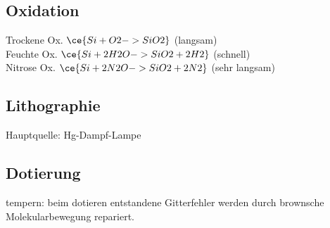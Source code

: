\documentclass[fs, footer]{latex4ei}
\begin{document}
\begin{multicols*}{4}
	
	\subsection{Oxidation}
	Trockene Ox. $\ce{Si + O2 -> SiO2}$ \qquad (langsam)\\
	Feuchte Ox. $\ce{Si + 2H2O -> SiO2 + 2H2}$ \qquad (schnell)\\
	Nitrose Ox. $\ce{Si + 2N2O -> SiO2 + 2N2}$ \qquad (sehr langsam)\\


	\subsection{Lithographie}
	Hauptquelle: Hg-Dampf-Lampe



	\subsection{Dotierung}
	tempern: beim dotieren entstandene Gitterfehler werden durch brownsche Molekularbewegung repariert.



%

\end{multicols*}

\end{document}
